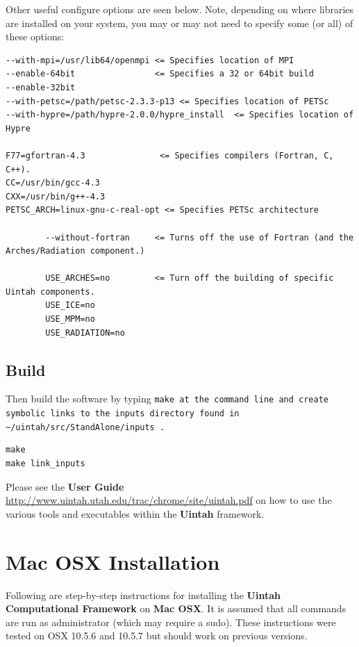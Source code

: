 \documentclass[12pt]{article}
\newcommand{\TT}[1]{\tt{#1} \normalfont}
\begin{document}
Other useful configure options are seen below.  Note, depending on
where libraries are installed on your system, you may or may not need
to specify some (or all) of these options:

\begin{verbatim}
--with-mpi=/usr/lib64/openmpi <= Specifies location of MPI
--enable-64bit                <= Specifies a 32 or 64bit build
--enable-32bit
--with-petsc=/path/petsc-2.3.3-p13 <= Specifies location of PETSc
--with-hypre=/path/hypre-2.0.0/hypre_install  <= Specifies location of Hypre

F77=gfortran-4.3               <= Specifies compilers (Fortran, C, C++).
CC=/usr/bin/gcc-4.3
CXX=/usr/bin/g++-4.3
PETSC_ARCH=linux-gnu-c-real-opt <= Specifies PETSc architecture

        --without-fortran     <= Turns off the use of Fortran (and the Arches/Radiation component.)

        USE_ARCHES=no         <= Turn off the building of specific Uintah components.
        USE_ICE=no
        USE_MPM=no
        USE_RADIATION=no

\end{verbatim}


\subsection{Build}

Then build the software by typing \TT{make} at the command line and create symbolic links to the inputs directory found in \TT{\textasciitilde/uintah/src/StandAlone/inputs}.
\begin{verbatim}
make
make link_inputs
\end{verbatim}

Please see the \textbf{User Guide}
\url{http://www.uintah.utah.edu/trac/chrome/site/uintah.pdf} on how to use
the various tools and executables within the \textbf{Uintah}
framework.

\section{Mac OSX Installation}

Following are step-by-step instructions for installing the
\textbf{Uintah Computational Framework} on \textbf{Mac OSX}.  It is
assumed that all commands are run as administrator (which may require
a sudo).  These instructions were tested on OSX 10.5.6 and 10.5.7 but
should work on previous versions.
\end{document}
